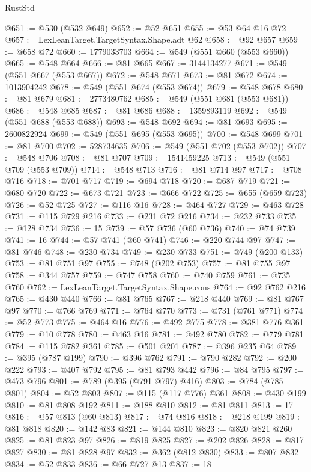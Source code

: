 \begin{lexlean}{RustStd}
\begin{coremodule}
@651 := @530 (@532 @649)
@652 := @52 @651
@655 := @53 @64 @16 @72
@657 := LexLeanTarget.TargetSyntax.Shape.adt @62
@658 := @92 @657
@659 := @658 @72
@660 := 1779033703
@664 := @549 (@551 @660 (@553 @660))
@665 := @548 @664
@666 := @81 @665
@667 := 3144134277
@671 := @549 (@551 @667 (@553 @667))
@672 := @548 @671
@673 := @81 @672
@674 := 1013904242
@678 := @549 (@551 @674 (@553 @674))
@679 := @548 @678
@680 := @81 @679
@681 := 2773480762
@685 := @549 (@551 @681 (@553 @681))
@686 := @548 @685
@687 := @81 @686
@688 := 1359893119
@692 := @549 (@551 @688 (@553 @688))
@693 := @548 @692
@694 := @81 @693
@695 := 2600822924
@699 := @549 (@551 @695 (@553 @695))
@700 := @548 @699
@701 := @81 @700
@702 := 528734635
@706 := @549 (@551 @702 (@553 @702))
@707 := @548 @706
@708 := @81 @707
@709 := 1541459225
@713 := @549 (@551 @709 (@553 @709))
@714 := @548 @713
@716 := @81 @714 @97
@717 := @708 @716
@718 := @701 @717
@719 := @694 @718
@720 := @687 @719
@721 := @680 @720
@722 := @673 @721
@723 := @666 @722
@725 := @655 (@659 @723)
@726 := @52 @725
@727 := @116 @16
@728 := @464 @727
@729 := @463 @728
@731 := @115 @729 @216
@733 := @231 @72 @216
@734 := @232 @733
@735 := @128 @734
@736 := 15
@739 := @57 @736 (@60 @736)
@740 := @74 @739
@741 := 16
@744 := @57 @741 (@60 @741)
@746 := @220 @744 @97
@747 := @81 @746
@748 := @230 @734
@749 := @230 @733
@751 := @749 (@200 @133)
@753 := @81 @751 @97
@755 := @748 (@202 @753)
@757 := @81 @755 @97
@758 := @344 @757
@759 := @747 @758
@760 := @740 @759
@761 := @735 @760
@762 := LexLeanTarget.TargetSyntax.Shape.cons
@764 := @92 @762 @216
@765 := @430 @440
@766 := @81 @765
@767 := @218 @440
@769 := @81 @767 @97
@770 := @766 @769
@771 := @764 @770
@773 := @731 (@761 @771)
@774 := @52 @773
@775 := @464 @16
@776 := @492 @775
@778 := @381 @776 @361
@779 := @10 @778
@780 := @463 @16
@781 := @492 @780
@782 := @779 @781
@784 := @115 @782 @361
@785 := @501 @201
@787 := @396 @235 @64
@789 := @395 (@787 @199)
@790 := @396 @762
@791 := @790 @282
@792 := @200 @222
@793 := @407 @792
@795 := @81 @793 @442
@796 := @84 @795
@797 := @473 @796
@801 := @789 (@395 (@791 @797) @416)
@803 := @784 (@785 @801)
@804 := @52 @803
@807 := @115 (@117 @776) @361
@808 := @430 @199
@810 := @81 @808 @192
@811 := @188 @810
@812 := @81 @811
@813 := 17
@816 := @57 @813 (@60 @813)
@817 := @74 @816
@818 := @218 @199
@819 := @81 @818
@820 := @142 @83
@821 := @144 @810
@823 := @820 @821 @260
@825 := @81 @823 @97
@826 := @819 @825
@827 := @202 @826
@828 := @817 @827
@830 := @81 @828 @97
@832 := @362 (@812 @830)
@833 := @807 @832
@834 := @52 @833
@836 := @66 @727 @13
@837 := 18

\end{coremodule}
\end{lexlean}
